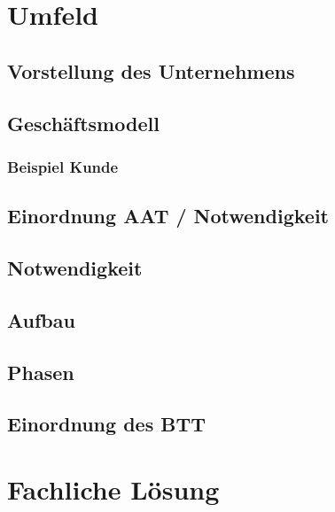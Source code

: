 \documentclass[12pt, titlepage]{article}
\begin{document}


\doublespacing







\newpage
\section{Umfeld}
\subsection{Vorstellung des Unternehmens}
\subsection{Geschäftsmodell}
\subsubsection{Beispiel Kunde}
\subsection{Einordnung AAT / Notwendigkeit}
\subsection{Notwendigkeit}
\subsection{Aufbau}
\subsection{Phasen}
\subsection{Einordnung des BTT}








\section{Fachliche Lösung}
\end{document}
